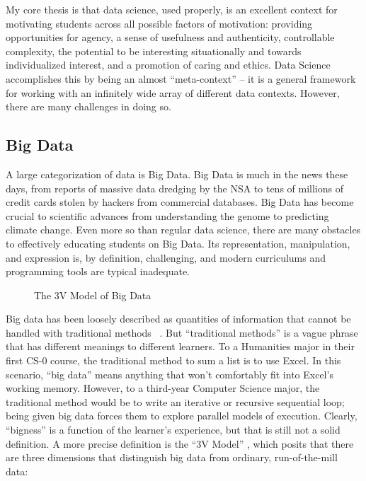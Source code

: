 My core thesis is that data science, used properly, is an excellent context for motivating students across all possible factors of motivation: providing opportunities for agency, a sense of usefulness and authenticity, controllable complexity, the potential to be interesting situationally and towards individualized interest, and a promotion of caring and ethics.
Data Science accomplishes this by being an almost ``meta-context'' -- it is a general framework for working with an infinitely wide array of different data contexts.
However, there are many challenges in doing so.

\subsection{Big Data}

A large categorization of data is Big Data. Big Data is much in the news these days, from reports of massive data
dredging by the NSA to tens of millions of credit cards stolen by
hackers from commercial databases.
Big Data has become crucial to scientific advances from understanding the
genome to predicting climate change.
Even more so than regular data science, there are many obstacles to effectively educating students on Big
Data.
Its representation, manipulation, and expression is, by definition, challenging, and modern curriculums and programming tools are typical inadequate.

\begin{wrapfigure}{r}{0.5\textwidth}
    \begin{center}
    \end{center}
    \vspace{-\bigskipamount}
    \caption{The 3V Model of Big Data}
    \label{fig-3v}
\end{wrapfigure}

Big data has been loosely described as quantities of information that cannot be handled with traditional methods ~\cite{McKinsey}.
But ``traditional methods'' is a vague phrase that has different meanings to different learners. To a Humanities major in their first CS-0 course, the traditional method to sum a list is to use Excel. In this scenario, ``big data'' means anything that won't comfortably fit into Excel's working memory.
However, to a third-year Computer Science major, the traditional method would be to write an iterative or recursive sequential loop; being given big data forces them to explore parallel models of execution.
Clearly, ``bigness'' is a function of the learner's experience, but that is still not a solid definition.
A more precise definition is the ``3V Model'' \cite{douglas2012importance}, which posits that there are three dimensions that distinguish big data from ordinary, run-of-the-mill data:

